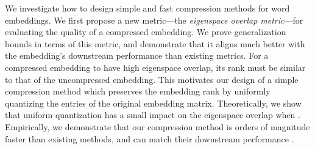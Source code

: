 

We investigate how to design simple and fast compression methods for word embeddings.
We first propose a new metric---the \textit{eigenspace overlap metric}---for evaluating the quality of a compressed embedding. 
We prove generalization bounds in terms of this metric, and demonstrate that it aligns much better with the embedding's downstream performance than existing metrics.
For a compressed embedding to have high eigenspace overlap, its rank must be similar to that of the uncompressed embedding.
This motivates our design of a simple compression method which preserves the embedding rank by uniformly quantizing the entries of the original embedding matrix.
Theoretically, we show that uniform quantization has a small impact on the eigenspace overlap when .
Empirically, we demonstrate that our compression method is orders of magnitude faster than existing methods, and can match their downstream performance .






